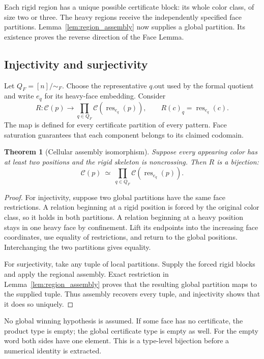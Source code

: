 \documentclass[11pt,reqno]{amsart}
\newtheorem{theorem}{Theorem}[section]
\theoremstyle{definition}
\newcommand{\Cert}{\mathcal C}
\newcommand{\Res}{\operatorname{res}}
\newcommand{\lean}[1]{\par\smallskip\noindent{\footnotesize Lean: \nolinkurl{#1}.}\par\smallskip}
\newcommand{\leanok}{}
\newcommand{\uses}[1]{}
\begin{document}
Each rigid region has a unique possible certificate block: its whole color
class, of size two or three. The heavy regions receive the independently
specified face partitions. Lemma~\ref{lem:region_assembly} now supplies a
global partition. Its existence proves the reverse direction of the Face
Lemma.

\subsection{Injectivity and surjectivity}
Let $Q_F=[n]/{\sim_F}$. Choose the representative $q.\mathrm{out}$ used by the
formal quotient and write $e_q$ for its heavy-face embedding. Consider
\begin{equation}\label{eq:restriction_map}
 R:\Cert(p)\longrightarrow\prod_{q\in Q_F}\Cert(\Res_{e_q}(p)),
 \qquad R(c)_q=\Res_{e_q}(c).
\end{equation}
The map is defined for every certificate partition of every pattern. Face
saturation guarantees that each component belongs to its claimed codomain.

\begin{theorem}[Cellular assembly isomorphism]\label{thm:cellular_assembly}
Suppose every appearing color has at least two positions and the rigid
skeleton is noncrossing. Then $R$ is a bijection:
\[
 \Cert(p)\ \simeq\ \prod_{q\in Q_F}\Cert(\Res_{e_q}(p)).
\]
\lean{LC004.heavyFaceCertificateEquiv}
\leanok
\uses{thm:confinement,lem:rigidity,lem:region_assembly}
\end{theorem}
\begin{proof}
For injectivity, suppose two global partitions have the same face
restrictions. A relation beginning at a rigid position is forced by the
original color class, so it holds in both partitions. A relation beginning
at a heavy position stays in one heavy face by confinement. Lift its endpoints
into the increasing face coordinates, use equality of restrictions, and
return to the global positions. Interchanging the two partitions gives
equality.

For surjectivity, take any tuple of local partitions. Supply the forced
rigid blocks and apply the regional assembly. Exact restriction in
Lemma~\ref{lem:region_assembly} proves that the resulting global partition
maps to the supplied tuple. Thus assembly recovers every tuple, and
injectivity shows that it does so uniquely.
\leanok
\end{proof}
No global winning hypothesis is assumed. If some face has no certificate,
the product type is empty; the global certificate type is empty as well.
For the empty word both sides have one element. This is a type-level
bijection before a numerical identity is extracted.
\end{document}
